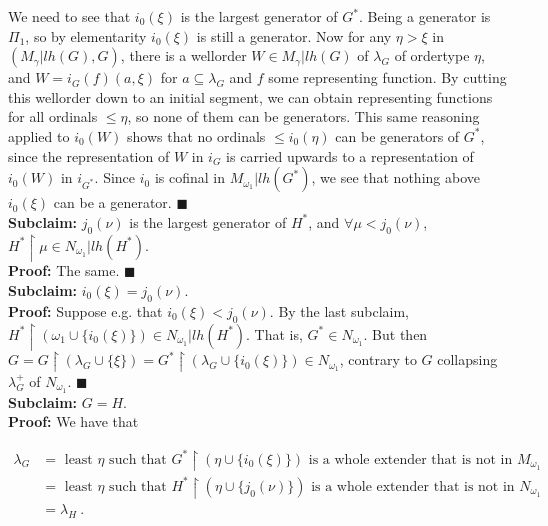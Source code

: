 \documentclass[12pt]{article}
\begin{document}
We need to see that $i_0 (\xi)$ is the largest generator of $G^*$.  Being a generator is $\Pi_1$, so by elementarity $i_0 (\xi)$ is still a generator.  Now for any $\eta > \xi$ in $( M_\gamma | lh(G), G)$, there is a wellorder $W \in M_\gamma | lh(G)$ of $\lambda_G$ of ordertype $\eta$, and $W = i_G (f) (a, \xi )$ for $a \subseteq \lambda_G$ and $f$ some representing function.  By cutting this wellorder down to an initial segment, we can obtain representing functions for all ordinals $\leq \eta$, so none of them can be generators.  This same reasoning applied to $i_0 (W)$ shows that no ordinals $\leq i_0 (\eta)$ can be generators of $G^*$, since the representation of $W$ in $i_G$ is carried upwards to a representation of $i_0 (W)$ in $i_{G^*}$.  Since $i_0$ is cofinal in $M_{\omega_1} | lh(G^*)$, we see that nothing above $i_0 (\xi)$ can be a generator. $\blacksquare$\\


\textbf{Subclaim:} $j_0 (\nu)$ is the largest generator of $H^*$, and $\forall \mu < j_0 (\nu)$, $H^* \restriction \mu \in N_{\omega_1} | lh(H^* )$.\\

\indent \indent \textbf{Proof:} The same. $\blacksquare$\\


\textbf{Subclaim:} $i_0 (\xi) = j_0 (\nu)$.\\

\indent \indent \textbf{Proof:} Suppose e.g. that $i_0 (\xi) < j_0 (\nu)$.  By the last subclaim, $H^* \restriction (\omega_1 \cup \{ i_0 (\xi) \} ) \in N_{\omega_1} | lh(H^* )$.  That is, $G^* \in N_{\omega_1}$.  But then $G = G \restriction ( \lambda_G \cup \{ \xi \} ) = G^* \restriction ( \lambda_G \cup \{ i_0 (\xi) \} ) \in N_{\omega_1}$, contrary to $G$ collapsing $\lambda_G^+$ of $N_{\omega_1}$. $\blacksquare$\\

\textbf{Subclaim:} $G = H$.\\

\indent \indent \textbf{Proof:} We have that

\[
\begin{split}
\lambda_G & = \text{ least $\eta$ such that } G^* \restriction (\eta \cup \{ i_0 (\xi) \} ) \text{ is a whole extender that is not in } M_{\omega_1}\\
& = \text{ least $\eta$ such that } H^* \restriction (\eta \cup \{ j_0 (\nu) \} ) \text{ is a whole extender that is not in } N_{\omega_1}\\
& = \lambda_H \ .
\end{split}
\]
\end{document}
